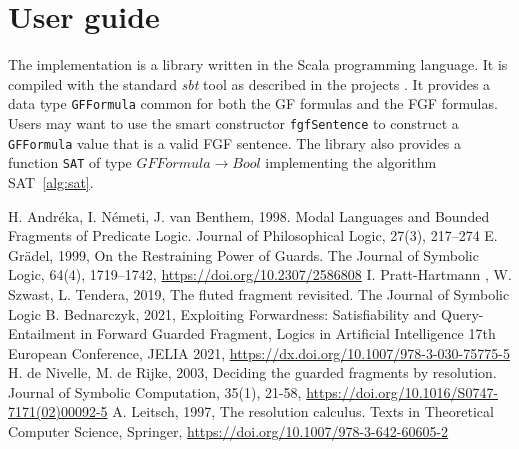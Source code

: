 \documentclass[english, shortabstract]{iithesis}
\theoremstyle{definition} \newtheorem{definition}{Definition}[chapter]
\theoremstyle{remark} \newtheorem{remark}[definition]{Observation}
\theoremstyle{plain} \newtheorem{theorem}[definition]{Theorem}
\theoremstyle{plain} \newtheorem{lemma}[definition]{Lemma}
\begin{document}
\section{User guide}

The implementation is a library written in the Scala programming language. It is compiled with the standard \emph{sbt} tool as described in the projects . 
It provides a data type \texttt{GFFormula} common for both the GF formulas and the FGF formulas.
Users may want to use the smart constructor \texttt{fgfSentence} to construct a \texttt{GFFormula} value that is a valid FGF sentence.
The library also provides a function \texttt{SAT} of type $\mathit{GFFormula} \rightarrow \mathit{Bool}$
implementing the algorithm SAT~\ref{alg:sat}.


\begin{thebibliography}{1}
 H. Andréka, I. Németi, J. van Benthem, 1998. Modal Languages and Bounded Fragments of Predicate Logic. Journal of Philosophical Logic, 27(3), 217--274
 E. Grädel, 1999, On the Restraining Power of Guards. The Journal of Symbolic Logic, 64(4), 1719--1742, \url{https://doi.org/10.2307/2586808}
 I. Pratt-Hartmann , W. Szwast, L. Tendera, 2019, The fluted fragment revisited. The Journal of Symbolic Logic
 B. Bednarczyk, 2021, Exploiting Forwardness: Satisfiability and Query-Entailment in Forward Guarded Fragment, Logics in Artificial Intelligence 17th European Conference, JELIA 2021, \url{https://dx.doi.org/10.1007/978-3-030-75775-5}
 H. de Nivelle, M. de Rijke, 2003, Deciding the guarded fragments by resolution. Journal of Symbolic Computation, 35(1), 21-58, \url{https://doi.org/10.1016/S0747-7171(02)00092-5}
 A. Leitsch, 1997, The resolution calculus. Texts in Theoretical Computer Science, Springer, \url{https://doi.org/10.1007/978-3-642-60605-2}
\end{thebibliography}

\end{document}
